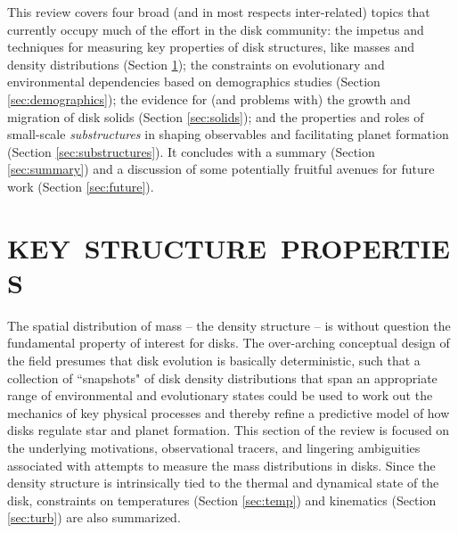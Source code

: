 \documentclass[a4paper]{ar-1col}
\begin{document}
This review covers four broad (and in most respects inter-related) topics that currently occupy much of the effort in the disk community: the impetus and techniques for measuring key properties of disk structures, like masses and density distributions (Section \ref{sec:structure}); the constraints on evolutionary and environmental dependencies based on demographics studies (Section \ref{sec:demographics}); the evidence for (and problems with) the growth and migration of disk solids (Section \ref{sec:solids}); and the properties and roles of small-scale {\it substructures} in shaping observables and facilitating planet formation (Section \ref{sec:substructures}).  It concludes with a summary (Section \ref{sec:summary}) and a discussion of some potentially fruitful avenues for future work (Section \ref{sec:future}).  




\section{KEY\ STRUCTURE\ PROPERTIES} \label{sec:structure}

The spatial distribution of mass -- the density structure -- is without question the fundamental property of interest for disks.  The over-arching conceptual design of the field presumes that disk evolution is basically deterministic, such that a collection of ``snapshots" of disk density distributions that span an appropriate range of environmental and evolutionary states could be used to work out the mechanics of key physical processes and thereby refine a predictive model of how disks regulate star and planet formation.  This section of the review is focused on the underlying motivations, observational tracers, and lingering ambiguities associated with attempts to measure the mass distributions in disks.  Since the density structure is intrinsically tied to the thermal and dynamical state of the disk, constraints on temperatures (Section \ref{sec:temp}) and kinematics (Section \ref{sec:turb}) are also summarized.        
\end{document}
